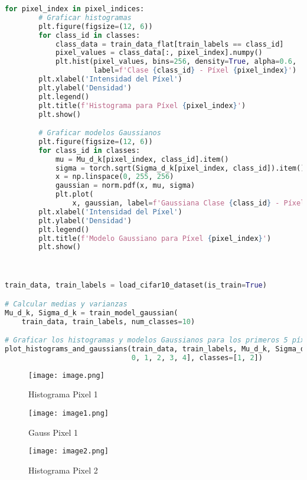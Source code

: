 \documentclass[spanish]{article}
\begin{document}
\begin{enumerate}
\begin{enumerate}
\begin{lstlisting}[language=Python, caption=Graficacion de Histogramas Y Curvas Gaussianas]
    for pixel_index in pixel_indices:
        # Graficar histogramas
        plt.figure(figsize=(12, 6))
        for class_id in classes:
            class_data = train_data_flat[train_labels == class_id]
            pixel_values = class_data[:, pixel_index].numpy()
            plt.hist(pixel_values, bins=256, density=True, alpha=0.6,
                     label=f'Clase {class_id} - Píxel {pixel_index}')
        plt.xlabel('Intensidad del Píxel')
        plt.ylabel('Densidad')
        plt.legend()
        plt.title(f'Histograma para Píxel {pixel_index}')
        plt.show()

        # Graficar modelos Gaussianos
        plt.figure(figsize=(12, 6))
        for class_id in classes:
            mu = Mu_d_k[pixel_index, class_id].item()
            sigma = torch.sqrt(Sigma_d_k[pixel_index, class_id]).item()
            x = np.linspace(0, 255, 256)
            gaussian = norm.pdf(x, mu, sigma)
            plt.plot(
                x, gaussian, label=f'Gaussiana Clase {class_id} - Píxel {pixel_index}')
        plt.xlabel('Intensidad del Píxel')
        plt.ylabel('Densidad')
        plt.legend()
        plt.title(f'Modelo Gaussiano para Píxel {pixel_index}')
        plt.show()



train_data, train_labels = load_cifar10_dataset(is_train=True)

# Calcular medias y varianzas
Mu_d_k, Sigma_d_k = train_model_gaussian(
    train_data, train_labels, num_classes=10)

# Graficar los histogramas y modelos Gaussianos para los primeros 5 píxeles de las clases 1 y 2
plot_histograms_and_gaussians(train_data, train_labels, Mu_d_k, Sigma_d_k, pixel_indices=[
                              0, 1, 2, 3, 4], classes=[1, 2])
\end{lstlisting}

\begin{figure}[h]
    \centering
    \texttt{[image: image.png]}
    \caption{Histograma Pixel 1}
    \label{fig:enter-label}
\end{figure}

\begin{figure}[h]
    \centering
    \texttt{[image: image1.png]}
    \caption{Gauss Pixel 1}
    \label{fig:enter-label}
\end{figure}


\newpage


\begin{figure}[h]
    \centering
    \texttt{[image: image2.png]}
    \caption{Histograma Pixel 2}
    \label{fig:enter-label}
\end{figure}


\end{enumerate}
\end{enumerate}
\end{document}
